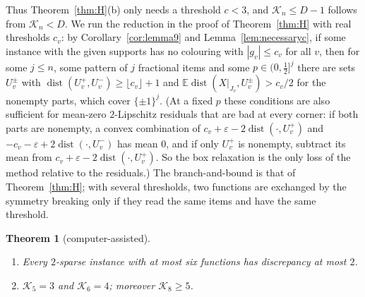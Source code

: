 \documentclass[11pt,letterpaper]{article}
\newtheorem{theorem}{Theorem}[section]
\theoremstyle{definition}
\newcommand{\E}{\mathbb{E}}
\newcommand{\cube}[1]{\{\pm1\}^{#1}}
\DeclareMathOperator{\dist}{dist}
\begin{document}
Thus Theorem~\ref{thm:H}(b) only needs a threshold $c<3$, and $\mathcal{K}_n\le D-1$ follows from
$\mathcal{K}_n<D$. We run the reduction in the proof of Theorem~\ref{thm:H} with real thresholds
$c_v$: by Corollary~\ref{cor:lemma9} and Lemma~\ref{lem:necessaryc}, if some instance with the given
supports has no colouring with $|g_v|\le c_v$ for all $v$, then for some $j\le n$, some pattern of
$j$ fractional items and some $p\in(0,\frac12]^j$ there are sets $U_v^\pm$ with
$\dist(U_v^+,U_v^-)\ge\lfloor c_v\rfloor+1$ and $\E\dist(X|_{J_v},U_v^\pm)>c_v/2$ for the nonempty parts,
which cover $\cube j$. (At a fixed $p$ these conditions are also sufficient for mean-zero $2$-Lipschitz
residuals that are bad at every corner: if both parts are nonempty, a convex combination of
$c_v+\varepsilon-2\dist(\cdot,U_v^+)$ and $-c_v-\varepsilon+2\dist(\cdot,U_v^-)$ has mean $0$, and if only
$U_v^+$ is nonempty, subtract its mean from $c_v+\varepsilon-2\dist(\cdot,U_v^+)$. So the box relaxation is
the only loss of the method relative to the residuals.) The branch-and-bound is that of
Theorem~\ref{thm:H}; with several thresholds, two functions are exchanged by the symmetry breaking only
if they read the same items and have the same threshold.

\begin{theorem}[computer-assisted]\label{thm:six}
\begin{enumerate}[label=(\alph*),itemsep=0pt]
\item Every $2$-sparse instance with at most six functions has discrepancy at most $2$.
\item $\mathcal{K}_5=3$ and $\mathcal{K}_6=4$; moreover $\mathcal{K}_8\ge5$.
\end{enumerate}
\end{theorem}
\end{document}
